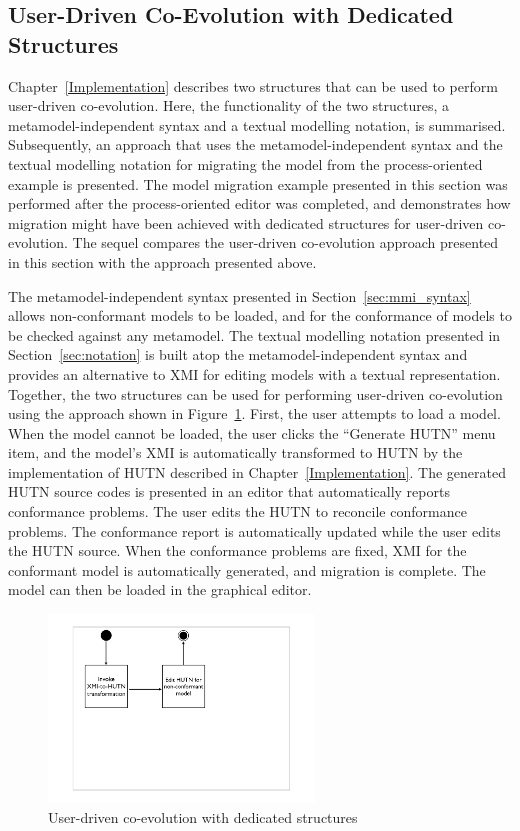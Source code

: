 \subsection{User-Driven Co-Evolution with Dedicated Structures}
\label{subsec:user-driven_co-evolution_with_dedicated_structures}

Chapter~\ref{Implementation} describes two structures that can be used to perform user-driven co-evolution. Here, the functionality of the two structures, a metamodel-independent syntax and a textual modelling notation, is summarised. Subsequently, an approach that uses the metamodel-independent syntax and the textual modelling notation for migrating the model from the process-oriented example is presented. The model migration example presented in this section was performed after the process-oriented editor was completed, and demonstrates how migration might have been achieved with dedicated structures for user-driven co-evolution. The sequel compares the user-driven co-evolution approach presented in this section with the approach presented above.

The metamodel-independent syntax presented in Section~\ref{sec:mmi_syntax} allows non-conformant models to be loaded, and for the conformance of models to be checked against any metamodel. The textual modelling notation presented in Section~\ref{sec:notation} is built atop the metamodel-independent syntax and provides an alternative to XMI for editing models with a textual representation. Together, the two structures can be used for performing user-driven co-evolution using the approach shown in Figure~\ref{fig:hutn_process}. First, the user attempts to load a model. When the model cannot be loaded, the user clicks the ``Generate HUTN'' menu item, and the model's XMI is automatically transformed to HUTN by the implementation of HUTN described in Chapter~\ref{Implementation}. The generated HUTN source codes is presented in an editor that automatically reports conformance problems. The user edits the HUTN to reconcile conformance problems. The conformance report is automatically updated while the user edits the HUTN source. When the conformance problems are fixed, XMI for the conformant model is automatically generated, and migration is complete. The model can then be loaded in the graphical editor.

\begin{figure}[htbp]
	\centering
	\includegraphics*[viewport=85 280 520 550,height=5cm]{6.Evaluation/images/user_driven/hutn_process.pdf}
	\caption{User-driven co-evolution with dedicated structures}
	\label{fig:hutn_process}
\end{figure}

